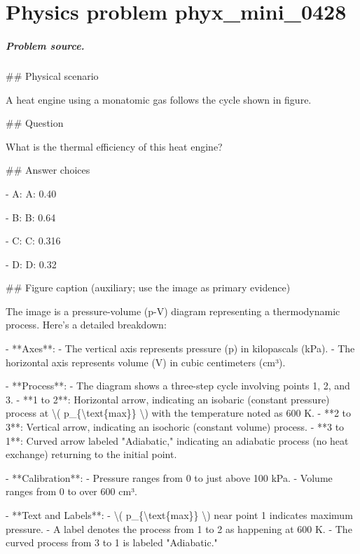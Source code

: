 
\chapter{Physics problem phyx\_mini\_0428}
\label{ch:PhyXMiniProblems_problem_phyx_mini_0428}

\paragraph{Problem source.}
\#\# Physical scenario

A heat engine using a monatomic gas follows the cycle shown in figure.

\#\# Question

What is the thermal efficiency of this heat engine?

\#\# Answer choices

- A: A: 0.40

- B: B: 0.64

- C: C: 0.316

- D: D: 0.32

\#\# Figure caption (auxiliary; use the image as primary evidence)

The image is a pressure-volume (p-V) diagram representing a thermodynamic process. Here's a detailed breakdown:

- **Axes**: 
  - The vertical axis represents pressure (p) in kilopascals (kPa).
  - The horizontal axis represents volume (V) in cubic centimeters (cm³).

- **Process**:
  - The diagram shows a three-step cycle involving points 1, 2, and 3.
  - **1 to 2**: Horizontal arrow, indicating an isobaric (constant pressure) process at \textbackslash{}( p\_\{\textbackslash{}text\{max\}\} \textbackslash{}) with the temperature noted as 600 K.
  - **2 to 3**: Vertical arrow, indicating an isochoric (constant volume) process.
  - **3 to 1**: Curved arrow labeled "Adiabatic," indicating an adiabatic process (no heat exchange) returning to the initial point.

- **Calibration**:
  - Pressure ranges from 0 to just above 100 kPa.
  - Volume ranges from 0 to over 600 cm³.

- **Text and Labels**:
  - \textbackslash{}( p\_\{\textbackslash{}text\{max\}\} \textbackslash{}) near point 1 indicates maximum pressure.
  - A label denotes the process from 1 to 2 as happening at 600 K.
  - The curved process from 3 to 1 is labeled "Adiabatic." 

